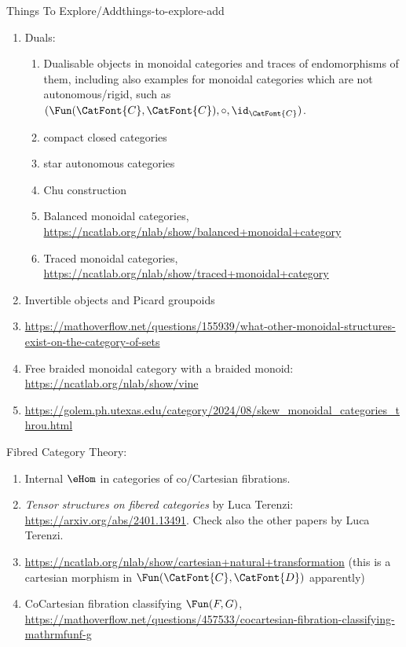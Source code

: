 \begin{remark}{Things To Explore/Add}{things-to-explore-add}
\begin{enumerate}
\[                    \xrightarrow{f\icoprod g}%
                    A\icoprod B%
                ]%
            \]%
        \item Duals:
            \begin{enumerate}
                \item Dualisable objects in monoidal categories and traces of endomorphisms of them, including also examples for monoidal categories which are not autonomous/rigid, such as $(\Fun(\CatFont{C},\CatFont{C}),\circ,\id_{\CatFont{C}})$.
                \item compact closed categories
                \item star autonomous categories
                \item Chu construction
                \item Balanced monoidal categories, \url{https://ncatlab.org/nlab/show/balanced+monoidal+category}
                \item Traced monoidal categories, \url{https://ncatlab.org/nlab/show/traced+monoidal+category}
            \end{enumerate}
        \item Invertible objects and Picard groupoids
        \item \url{https://mathoverflow.net/questions/155939/what-other-monoidal-structures-exist-on-the-category-of-sets}
        \item Free braided monoidal category with a braided monoid: \url{https://ncatlab.org/nlab/show/vine}
        \item \url{https://golem.ph.utexas.edu/category/2024/08/skew_monoidal_categories_throu.html}
    \end{enumerate}
    Fibred Category Theory:
    \begin{enumerate}
        \item Internal $\eHom$ in categories of co/Cartesian fibrations.
        \item \textit{Tensor structures on fibered categories} by Luca Terenzi: \url{https://arxiv.org/abs/2401.13491}. Check also the other papers by Luca Terenzi.
        \item \url{https://ncatlab.org/nlab/show/cartesian+natural+transformation} (this is a cartesian morphism in $\Fun(\CatFont{C},\CatFont{D})$ apparently)
        \item CoCartesian fibration classifying $\Fun(F,G)$, \url{https://mathoverflow.net/questions/457533/cocartesian-fibration-classifying-mathrmfunf-g}
    \end{enumerate}

\end{remark}
